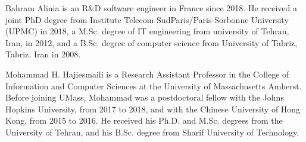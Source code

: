 \vspace{-10mm}
\begin{IEEEbiography}{Bahram Alinia} is an R\&D software engineer in France since 2018. He received a joint PhD degree from Institute Telecom SudParis/Paris-Sorbonne University (UPMC) in 2018, a M.Sc. degree of IT engineering from university of Tehran, Iran,  in 2012, and a B.Sc. degree of computer science from University of Tabriz, Tabriz, Iran in 2008.
\end{IEEEbiography}
\begin{IEEEbiography}{Mohammad H. Hajiesmaili} is a Research Assistant Professor in the College of Information and Computer Sciences at the University of Massachusetts Amherst. Before joining UMass, Mohammad was a postdoctoral fellow with the Johns Hopkins University, from 2017 to 2018, and with the Chinese University of Hong Kong, from 2015 to 2016. He received his Ph.D. and M.Sc. degrees from the University of Tehran, and his B.Sc. degree from Sharif University of Technology.
\end{IEEEbiography}

